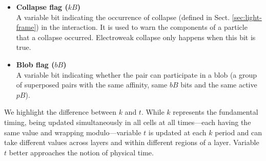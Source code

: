 \documentclass{ijuc}
\begin{document}
\begin{itemize}
    \item \textbf{Collapse flag ($kB$)} \\
    A variable bit indicating the occurrence of collapse (defined in Sect. \ref{sec:light-frame}) in the interaction. It is used to warn the components of a particle that a collapse occurred. Electroweak collapse only happens when this bit is true.

    \item \textbf{Blob flag ($bB$)} \\
    A variable bit indicating whether the pair can participate in a blob (a group of superposed pairs with the same affinity, same $bB$ bits and the same active $pB$).

\end{itemize}

We highlight the difference between $k$ and $t$. 
While $k$ represents the fundamental timing, being updated simultaneously in all cells at all times—each having the same value and wrapping modulo—variable $t$ is updated at each $k$ period and can take different values across layers and within different regions of a layer. 
Variable $t$ better approaches the notion of physical time.
\end{document}
